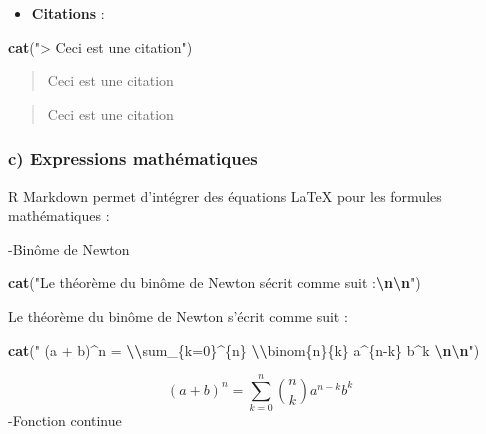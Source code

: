 \documentclass[
]{article}
\newenvironment{Shaded}{\begin{snugshade}}{\end{snugshade}}
\newcommand{\FunctionTok}[1]{\textcolor[rgb]{0.13,0.29,0.53}{\textbf{#1}}}
\newcommand{\NormalTok}[1]{#1}
\newcommand{\SpecialCharTok}[1]{\textcolor[rgb]{0.81,0.36,0.00}{\textbf{#1}}}
\newcommand{\StringTok}[1]{\textcolor[rgb]{0.31,0.60,0.02}{#1}}
\providecommand{\tightlist}{%
  \setlength{\itemsep}{0pt}\setlength{\parskip}{0pt}}
\begin{document}
\begin{itemize}
\tightlist
\item
  \textbf{Citations} :
\end{itemize}

\begin{Shaded}
\begin{Highlighting}[]
\FunctionTok{cat}\NormalTok{(}\StringTok{"\textgreater{} Ceci est une citation"}\NormalTok{)}
\end{Highlighting}
\end{Shaded}

\begin{quote}
Ceci est une citation
\end{quote}

\begin{quote}
Ceci est une citation
\end{quote}

\hypertarget{c-expressions-mathuxe9matiques}{%
\subsubsection{c) Expressions
mathématiques}\label{c-expressions-mathuxe9matiques}}

R Markdown permet d'intégrer des équations LaTeX pour les formules
mathématiques :

-Binôme de Newton

\begin{Shaded}
\begin{Highlighting}[]
\FunctionTok{cat}\NormalTok{(}\StringTok{"Le théorème du binôme de Newton s\textquotesingle{}écrit comme suit :}\SpecialCharTok{\textbackslash{}n\textbackslash{}n}\StringTok{"}\NormalTok{)}
\end{Highlighting}
\end{Shaded}

Le théorème du binôme de Newton s'écrit comme suit :

\begin{Shaded}
\begin{Highlighting}[]
\FunctionTok{cat}\NormalTok{(}\StringTok{"$$ (a + b)\^{}n = }\SpecialCharTok{\textbackslash{}\textbackslash{}}\StringTok{sum\_\{k=0\}\^{}\{n\} }\SpecialCharTok{\textbackslash{}\textbackslash{}}\StringTok{binom\{n\}\{k\} a\^{}\{n{-}k\} b\^{}k $$}\SpecialCharTok{\textbackslash{}n\textbackslash{}n}\StringTok{"}\NormalTok{)}
\end{Highlighting}
\end{Shaded}

\[ (a + b)^n = \sum_{k=0}^{n} \binom{n}{k} a^{n-k} b^k \] -Fonction
continue
\end{document}
